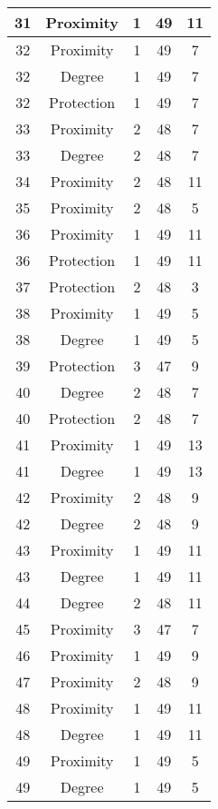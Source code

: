 \documentclass[results.tex]{subfiles}
\begin{document}
\begin{center}
\begin{tabular}{| c || c | c | c | c |}
    31 & Proximity & 1 & 49 & 11 \\ 
    \hline
    32 & Proximity & 1 & 49 & 7 \\ 
    \hline
    32 & Degree & 1 & 49 & 7 \\ 
    \hline
    32 & Protection & 1 & 49 & 7 \\ 
    \hline
    33 & Proximity & 2 & 48 & 7 \\ 
    \hline
    33 & Degree & 2 & 48 & 7 \\ 
    \hline
    34 & Proximity & 2 & 48 & 11 \\ 
    \hline
    35 & Proximity & 2 & 48 & 5 \\ 
    \hline
    36 & Proximity & 1 & 49 & 11 \\ 
    \hline
    36 & Protection & 1 & 49 & 11 \\ 
    \hline
    37 & Protection & 2 & 48 & 3 \\ 
    \hline
    38 & Proximity & 1 & 49 & 5 \\ 
    \hline
    38 & Degree & 1 & 49 & 5 \\ 
    \hline
    39 & Protection & 3 & 47 & 9 \\ 
    \hline
    40 & Degree & 2 & 48 & 7 \\ 
    \hline
    40 & Protection & 2 & 48 & 7 \\ 
    \hline
    41 & Proximity & 1 & 49 & 13 \\ 
    \hline
    41 & Degree & 1 & 49 & 13 \\ 
    \hline
    42 & Proximity & 2 & 48 & 9 \\ 
    \hline
    42 & Degree & 2 & 48 & 9 \\ 
    \hline
    43 & Proximity & 1 & 49 & 11 \\ 
    \hline
    43 & Degree & 1 & 49 & 11 \\ 
    \hline
    44 & Degree & 2 & 48 & 11 \\ 
    \hline
    45 & Proximity & 3 & 47 & 7 \\ 
    \hline
    46 & Proximity & 1 & 49 & 9 \\ 
    \hline
    47 & Proximity & 2 & 48 & 9 \\ 
    \hline
    48 & Proximity & 1 & 49 & 11 \\ 
    \hline
    48 & Degree & 1 & 49 & 11 \\ 
    \hline
    49 & Proximity & 1 & 49 & 5 \\ 
    \hline
    49 & Degree & 1 & 49 & 5 \\ 
    \hline   \end{tabular}
\end{center}
\end{document}
